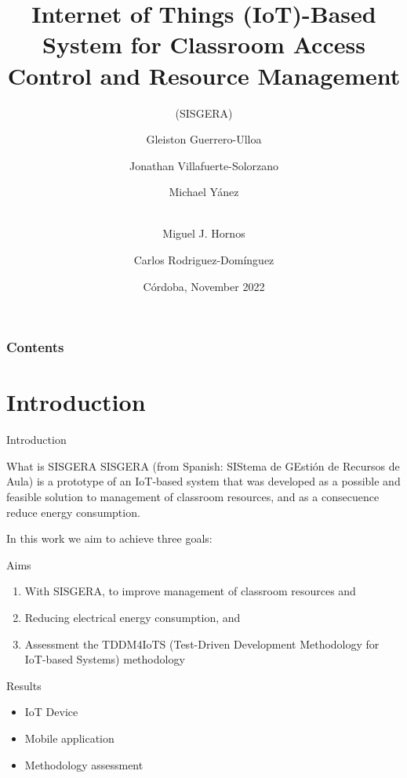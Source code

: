 \documentclass[notes=show, 10pt, xcolor=table]{beamer}
\title[UCAmI 2022]{Internet of Things (IoT)-Based System for Classroom Access Control and Resource Management}
\subtitle{(SISGERA)}
\author[Gleiston Guerrero-Ulloa]{Gleiston Guerrero-Ulloa \and Jonathan Villafuerte-Solorzano \and Michael Yánez  \and \\Miguel J. Hornos \and Carlos Rodriguez-Domínguez}
\institute[gguerrero@uteq.edu.ec]{Technical State University of Quevedo, and University of Granada}
\date[Córdoba, November 2022]{Córdoba, November 2022}
\begin{document}
\frame{\titlepage}
\begin{frame}
\frametitle{Contents}
\tableofcontents
\end{frame}
\section{Introduction}
    \begin{frame}{Introduction}
        \begin{block}{What is SISGERA}
            SISGERA (from Spanish: SIStema de GEstión de Recursos de Aula) is a prototype of an IoT-based system that was developed as a possible and feasible solution to management of classroom resources, and as a consecuence reduce energy consumption.
        \end{block}
        In this work we aim to achieve three goals:
        \begin{block}{Aims}
            \begin{enumerate}
                \item With SISGERA, to improve management of classroom resources and
                \item Reducing electrical energy consumption, and
                \item Assessment the TDDM4IoTS (Test-Driven Development Methodology for IoT-based Systems) methodology
            \end{enumerate}
        \end{block}
    
        \begin{block}{Results}
            \begin{itemize}
                \item IoT Device
                \item Mobile application
                \item Methodology assessment
            \end{itemize}
        \end{block}
\end{frame}
\end{document}
